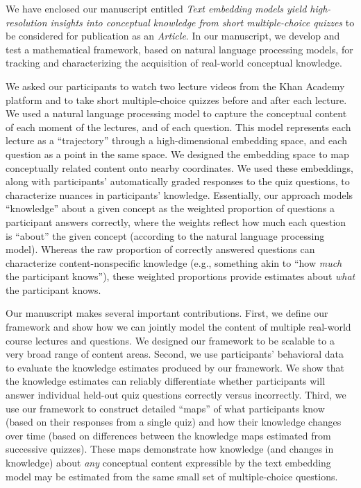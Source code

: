 \documentclass[11pt,stdletter,orderfromtodate,sigleft]{newlfm}
\newcommand{\articletype}{Article}
\newcommand{\myTitle}{Text embedding models yield high-resolution insights into conceptual knowledge from short multiple-choice quizzes}
\begin{document}
\begin{newlfm}

  We have enclosed our manuscript entitled \textit{\myTitle} to be considered for
  publication as an \textit{\articletype}. In our manuscript, we develop and
  test a mathematical framework, based on natural language processing models,
  for tracking and characterizing the acquisition of real-world conceptual
  knowledge.

  We asked our participants to watch two lecture videos from the Khan Academy
  platform and to take short multiple-choice quizzes before and after each
  lecture. We used a natural language processing model to capture the
  conceptual content of each moment of the lectures, and of each question. This
  model represents each lecture as a ``trajectory'' through a high-dimensional
  embedding space, and each question as a point in the same space. We designed
  the embedding space to map conceptually related content onto nearby
  coordinates. We used these embeddings, along with participants' automatically
  graded responses to the quiz questions, to characterize nuances in
  participants' knowledge. Essentially, our approach models ``knowledge'' about
  a given concept as the weighted proportion of questions a participant answers
  correctly, where the weights reflect how much each question is ``about'' the
  given concept (according to the natural language processing model). Whereas
  the raw proportion of correctly answered questions can characterize
  content-nonspecific knowledge (e.g., something akin to ``how \textit{much}
  the participant knows''), these weighted proportions provide estimates about
  \textit{what} the participant knows.

  Our manuscript makes several important contributions. First, we define our
  framework and show how we can jointly model the content of multiple
  real-world course lectures and questions. We designed our framework to be
  scalable to a very broad range of content areas. Second, we use participants'
  behavioral data to evaluate the knowledge estimates produced by our
  framework. We show that the knowledge estimates can reliably differentiate
  whether participants will answer individual held-out quiz questions correctly
  versus incorrectly. Third, we use our framework to construct detailed
  ``maps'' of what participants know (based on their responses from a single
  quiz) and how their knowledge changes over time (based on differences between
  the knowledge maps estimated from successive quizzes). These maps demonstrate
  how knowledge (and changes in knowledge) about \textit{any} conceptual
  content expressible by the text embedding model may be estimated from the
  same small set of multiple-choice questions.
  

\end{newlfm}
\end{document}
